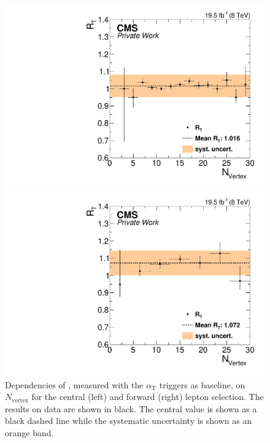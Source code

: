 \begin{figure}[htbp]
\centering
\begin{minipage}[t]{0.49\textwidth}
  \includegraphics[width=\textwidth]{plots/BG/trigger/Triggereff_SFvsOF_Syst_AlphaT_HighHTExclusiveCentral_Full2012_nVtx_None.pdf}
\end{minipage}
\begin{minipage}[t]{0.49\textwidth}
\includegraphics[width=\textwidth]{plots/BG/trigger/Triggereff_SFvsOF_Syst_AlphaT_HighHTExclusiveForward_Full2012_nVtx_None.pdf}
\end{minipage}
\caption{Dependencies of \RT, measured with the $\alpha_{\mathrm{T}}$ triggers as baseline, on $N_{\text{vertex}}$ for the central (left) and forward (right) lepton selection. The results on data are shown in black. The central value is shown as a black dashed line while the systematic uncertainty is shown as an orange band.}
\label{fig:RTDependenciesApp3}
\end{figure}  
